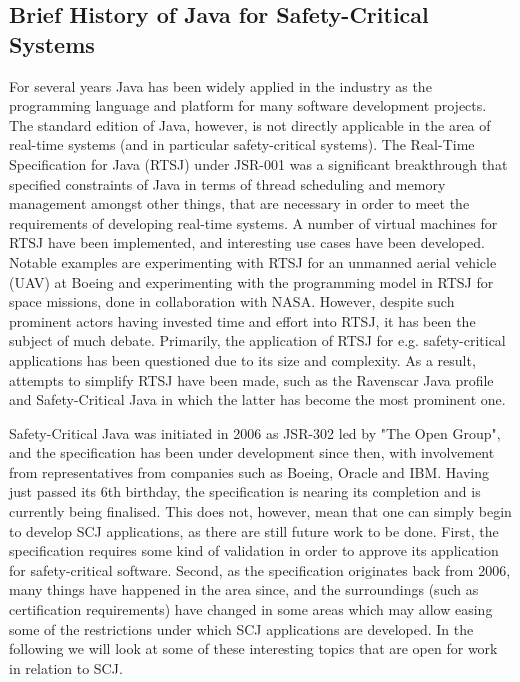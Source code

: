 \subsection{Brief History of Java for Safety-Critical Systems} %
\label{sub:brief_history_of_java_for_safety_critical_systems}
For several years Java has been widely applied in the industry as the programming language and platform for many software development projects. The standard edition of Java, however, is not directly applicable in the area of real-time systems (and in particular safety-critical systems). The Real-Time Specification for Java (RTSJ) under JSR-001\cite{alan2001real}\cite{henties:2009-20} was a significant breakthrough that specified constraints of Java in terms of thread scheduling and memory management amongst other things, that are necessary in order to meet the requirements of developing real-time systems. A number of virtual machines for RTSJ have been implemented, and interesting use cases have been developed. Notable examples are experimenting with RTSJ for an unmanned aerial vehicle (UAV) at Boeing\cite{Armbruster:2007:RJV:1324969.1324974} and experimenting with the programming model in RTSJ for space missions, done in collaboration with NASA\cite{DBLP:conf/isorc/DvorakBCCCGIMMR04}. However, despite such prominent actors having invested time and effort into RTSJ, it has been the subject of much debate. Primarily, the application of RTSJ for e.g. safety-critical applications has been questioned due to its size and complexity. As a result, attempts to simplify RTSJ have been made, such as the Ravenscar Java profile and Safety-Critical Java in which the latter has become the most prominent one.

Safety-Critical Java was initiated in 2006 as JSR-302 led by "The Open Group", and the specification has been under development since then, with involvement from representatives from companies such as Boeing, Oracle and IBM. Having just passed its 6th birthday, the specification is nearing its completion and is currently being finalised. This does not, however, mean that one can simply begin to develop SCJ applications, as there are still future work to be done. First, the specification requires some kind of validation in order to approve its application for safety-critical software. Second, as the specification originates back from 2006, many things have happened in the area since, and the surroundings (such as certification requirements) have changed in some areas which may allow easing some of the restrictions under which SCJ applications are developed. In the following we will look at some of these interesting topics that are open for work in relation to SCJ.

